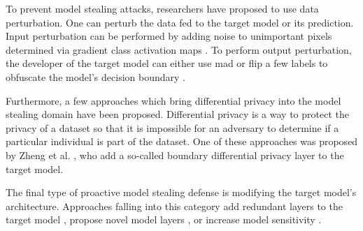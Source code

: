 To prevent model stealing attacks, researchers have proposed to use data perturbation. One can perturb the data fed to the target model or its prediction.
Input perturbation can be performed by adding noise to unimportant pixels determined via gradient class activation maps \cite{guiga2020neural}. To perform output perturbation,
the developer of the target model can either use \gls{mad} \cite{orekondy2019prediction} or flip a few labels to obfuscate the model's decision boundary
\cite{shi2017evasion}. \par
Furthermore, a few approaches which bring differential privacy into the model stealing domain have been proposed. Differential privacy is a way to protect the privacy of a dataset so that 
it is impossible for an adversary to determine if a particular individual is part of the dataset. One of these approaches was proposed by Zheng et al. \cite{zheng2019bdpl}, who add a 
so-called boundary differential privacy layer to the target model. \par
The final type of proactive model stealing defense is modifying the target model's architecture. Approaches falling into this category add redundant layers to the target model 
\cite{chabanne2020protection}, propose novel model layers \cite{xu2018deepobfuscation}, or increase model sensitivity \cite{szentannai2020preventing}.